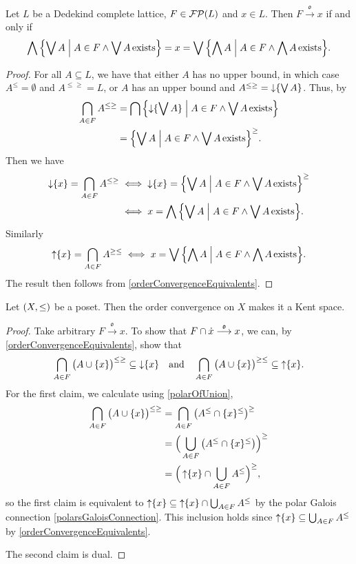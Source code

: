 \begin{proposition}
Let $L$ be a Dedekind complete lattice, $F\in \operatorname{\mathcal{FP}}(L)$ and $x\in L$. Then $F\overset{\mathfrak{o}}{\longrightarrow} x$ \textup{if and only if}
\[ \bigwedge \setbuilder{\bigvee A}{A\in F \land \bigvee A\,\text{exists}} = x = \bigvee \setbuilder{\bigwedge A}{A\in F \land \bigwedge A\,\text{exists}}. \]
\end{proposition}
\begin{proof}
For all $A\subseteq L$, we have that either $A$ has no upper bound, in which case $A^{\leq} = \emptyset$ and $A^{\leq\geq} = L$, or $A$ has an upper bound and $A^{\leq\geq} = \operatorname{\downarrow} \{\bigvee A\}$. Thus, by 
\begin{align*}
\bigcap_{A\in F}A^{\leq \geq} &= \bigcap \setbuilder{\downset \{\bigvee A\} }{A\in F \land \bigvee A\,\text{exists}} \\
&= \setbuilder{\bigvee A}{A\in F \land \bigvee A\,\text{exists}}^{\geq}.
\end{align*}
Then we have
\begin{align*}
\downset \{x\} = \bigcap_{A\in F}A^{\leq \geq} &\iff \downset \{x\} = \setbuilder{\bigvee A}{A\in F \land \bigvee A\,\text{exists}}^{\geq} \\
&\iff x = \bigwedge \setbuilder{\bigvee A}{A\in F \land \bigvee A\,\text{exists}}.
\end{align*}
Similarly
\[ \upset \{x\} = \bigcap_{A\in F}A^{\geq \leq} \iff x = \bigvee \setbuilder{\bigwedge A}{A\in F \land \bigwedge A\,\text{exists}}. \]
The result then follows from \ref{orderConvergenceEquivalents}.
\end{proof}

\begin{proposition}
Let $\sSet{X,\leq}$ be a poset. Then the order convergence on $X$ makes it a Kent space.
\end{proposition}
\begin{proof}
Take arbitrary $F \overset{\mathfrak{o}}{\longrightarrow} x$.
To show that $F\cap \dot{x}\overset{\mathfrak{o}}{\longrightarrow} x$, we can, by \ref{orderConvergenceEquivalents}, show that
\[ \bigcap_{A\in F}\big(A\cup \{x\}\big)^{\leq\geq} \subseteq \operatorname{\downarrow}\{x\} \quad\text{and}\quad \bigcap_{A\in F}\big(A\cup \{x\}\big)^{\geq\leq} \subseteq \operatorname{\uparrow}\{x\}. \]
For the first claim, we calculate using \ref{polarOfUnion},
\begin{align*}
\bigcap_{A\in F}\big(A\cup \{x\}\big)^{\leq\geq} &= \bigcap_{A\in F}\big(A^\leq \cap \{x\}^\leq\big)^{\geq} \\
&= \Big(\bigcup_{A\in F}\big(A^\leq \cap \{x\}^\leq\big)\Big)^{\geq} \\
&= \Big(\operatorname{\uparrow} \{x\} \cap \bigcup_{A\in F}A^\leq \Big)^{\geq},
\end{align*}
so the first claim is equivalent to $\operatorname{\uparrow} \{x\} \subseteq \operatorname{\uparrow} \{x\} \cap \bigcup_{A\in F}A^\leq$ by the polar Galois connection \ref{polarsGaloisConnection}. This inclusion holds since $\operatorname{\uparrow} \{x\} \subseteq \bigcup_{A\in F}A^\leq$ by \ref{orderConvergenceEquivalents}.

The second claim is dual.
\end{proof}

